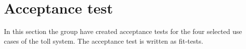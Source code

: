 \chapter{Acceptance test}
In this section the group have created acceptance tests for the four selected use cases of the toll system. The acceptance test is written as fit-tests.





